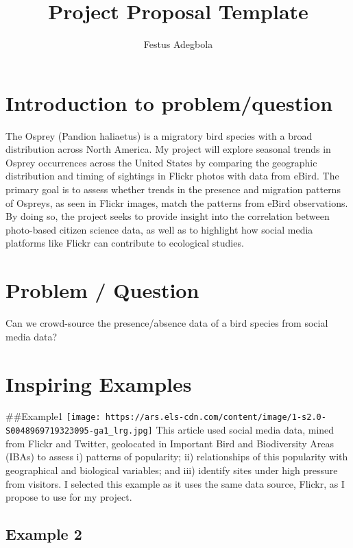 \documentclass[
]{article}
\title{Project Proposal Template}
\author{Festus Adegbola}
\date{}
\begin{document}
\maketitle

\section{Introduction to
problem/question}\label{introduction-to-problemquestion}

The Osprey (Pandion haliaetus) is a migratory bird species with a broad
distribution across North America. My project will explore seasonal
trends in Osprey occurrences across the United States by comparing the
geographic distribution and timing of sightings in Flickr photos with
data from eBird. The primary goal is to assess whether trends in the
presence and migration patterns of Ospreys, as seen in Flickr images,
match the patterns from eBird observations. By doing so, the project
seeks to provide insight into the correlation between photo-based
citizen science data, as well as to highlight how social media platforms
like Flickr can contribute to ecological studies.

\section{Problem / Question}\label{problem-question}

Can we crowd-source the presence/absence data of a bird species from
social media data?

\section{Inspiring Examples}\label{inspiring-examples}

\#\#Example1
\texttt{[image: https://ars.els-cdn.com/content/image/1-s2.0-S0048969719323095-ga1\_lrg.jpg]}
This article used social media data, mined from Flickr and Twitter,
geolocated in Important Bird and Biodiversity Areas (IBAs) to assess i)
patterns of popularity; ii) relationships of this popularity with
geographical and biological variables; and iii) identify sites under
high pressure from visitors. I selected this example as it uses the same
data source, Flickr, as I propose to use for my project.

\subsection{Example 2}\label{example-2}
\end{document}
